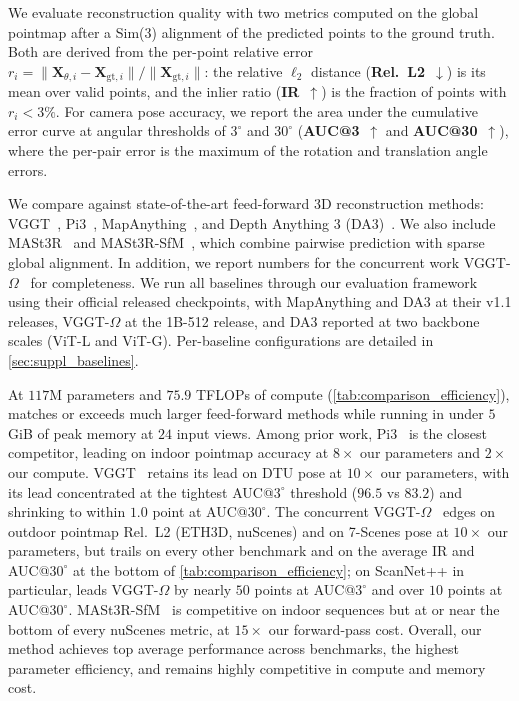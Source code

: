 We evaluate reconstruction quality with two metrics computed on the global pointmap after a Sim(3) alignment of the predicted points to the ground truth. Both are derived from the per-point relative error $r_i = \lVert \mathbf{X}_{\theta,i} - \mathbf{X}_{\text{gt},i}\rVert / \lVert \mathbf{X}_{\text{gt},i}\rVert$: the relative $\ell_2$ distance (\textbf{Rel.~L2}~$\downarrow$) is its mean over valid points, and the inlier ratio (\textbf{IR}~$\uparrow$) is the fraction of points with $r_i < 3\%$.
For camera pose accuracy, we report the area under the cumulative error curve at angular thresholds of $3^{\circ}$ and $30^{\circ}$ (\textbf{AUC@3}~$\uparrow$ and \textbf{AUC@30}~$\uparrow$), where the per-pair error is the maximum of the rotation and translation angle errors.

We compare against state-of-the-art feed-forward 3D reconstruction methods: VGGT~\citep{vggt}, Pi3~\citep{wang2025pi}, MapAnything~\citep{keetha2026mapanything}, and Depth Anything 3 (DA3)~\citep{lin2025depth}. We also include MASt3R~\citep{leroy2025grounding} and MASt3R-SfM~\citep{duisterhof2024mast3rsfm}, which combine pairwise prediction with sparse global alignment. In addition, we report numbers for the concurrent work VGGT-$\Omega$~\citep{vggt_omega} for completeness. We run all baselines through our evaluation framework using their official released checkpoints, with MapAnything and DA3 at their v1.1 releases, VGGT-$\Omega$ at the 1B-512 release, and DA3 reported at two backbone scales (ViT-L and ViT-G). Per-baseline configurations are detailed in \cref{sec:suppl_baselines}.






At $117$M parameters and $75.9$ TFLOPs of compute (\cref{tab:comparison_efficiency}), \methodname{} matches or exceeds much larger feed-forward methods while running in under $5$ GiB of peak memory at $24$ input views.
Among prior work, Pi3~\citep{wang2025pi} is the closest competitor, leading on indoor pointmap accuracy at $8{\times}$ our parameters and $2{\times}$ our compute. VGGT~\citep{vggt} retains its lead on DTU pose at $10{\times}$ our parameters, with its lead concentrated at the tightest AUC@$3^{\circ}$ threshold ($96.5$ vs $83.2$) and shrinking to within $1.0$ point at AUC@$30^{\circ}$.
The concurrent VGGT-$\Omega$~\citep{vggt_omega} edges \methodname{} on outdoor pointmap Rel.~L2 (ETH3D, nuScenes) and on 7-Scenes pose at $10{\times}$ our parameters, but trails on every other benchmark and on the average IR and AUC@$30^{\circ}$ at the bottom of \cref{tab:comparison_efficiency}; on ScanNet++ in particular, \methodname{} leads VGGT-$\Omega$ by nearly $50$ points at AUC@$3^{\circ}$ and over $10$ points at AUC@$30^{\circ}$.
MASt3R-SfM~\citep{duisterhof2024mast3rsfm} is competitive on indoor sequences but at or near the bottom of every nuScenes metric, at $15{\times}$ our forward-pass cost. Overall, our method achieves top average performance across benchmarks, the highest parameter efficiency, and remains highly competitive in compute and memory cost.

